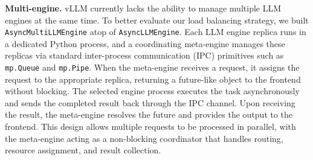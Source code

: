 \vspace{1mm}
\noindent \textbf{Multi-engine.} vLLM currently lacks the ability to manage multiple LLM engines at the same time. To better evaluate our load balancing strategy, we built \texttt{AsyncMultiLLMEngine} atop of \texttt{AsyncLLMEngine}. Each LLM engine replica runs in a dedicated Python process, and a coordinating meta-engine manages these replicas via standard inter-process communication (IPC) primitives such as \texttt{mp.Queue} and \texttt{mp.Pipe}. When the meta-engine receives a request, it assigns the request to the appropriate replica, returning a future-like object to the frontend without blocking. The selected engine process executes the task asynchronously and sends the completed result back through the IPC channel. Upon receiving the result, the meta-engine resolves the future and provides the output to the frontend. This design allows multiple requests to be processed in parallel, with the meta-engine acting as a non-blocking coordinator that handles routing, resource assignment, and result collection.




